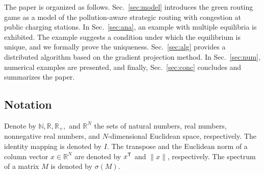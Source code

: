 \documentclass[letterpaper, 10 pt, conference]{ieeeconf}  %
\newcommand{\mc}[1]{\mathcal{#1}}
\newcommand{\bR}{\mathbb{R}}
\begin{document}

The paper is organized as follows.
Sec.~\ref{sec:model} introduces the green routing game as a model of the pollution-aware strategic routing with congestion at public charging stations.
In Sec.~\ref{sec:ana}, an example with multiple equilibria is exhibited.
The example suggests a condition under which the equilibrium is unique, and we formally prove the uniqueness.
Sec.~\ref{sec:alg} provides a distributed algorithm based on the gradient projection method.
In Sec.~\ref{sec:num}, numerical examples are presented, and finally, Sec.~\ref{sec:conc} concludes and summarizes the paper.

\subsection*{Notation}

Denote by $\mathbb{N},\bR,\bR_+,$ and $\bR^N$ the sets of natural numbers, real numbers, nonnegative real numbers, and $N$-dimensional Euclidean space, respectively.
The identity mapping is denoted by $I$.
The transpose and the Euclidean norm of a column vector $x\in\bR^N$ are denoted by $x^{\sf T}$ and $\|x\|$, respectively.
The spectrum of a matrix $M$ is denoted by $\sigma(M)$.
\end{document}
